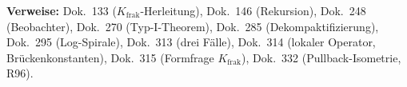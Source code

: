 \medskip\noindent
\textbf{Verweise:} Dok.~133 ($K_{\text{frak}}$-Herleitung),
Dok.~146 (Rekursion), Dok.~248 (Beobachter),
Dok.~270 (Typ-I-Theorem), Dok.~285 (Dekompaktifizierung),
Dok.~295 (Log-Spirale), Dok.~313 (drei Fälle),
Dok.~314 (lokaler Operator, Brückenkonstanten),
Dok.~315 (Formfrage $K_{\text{frak}}$),
Dok.~332 (Pullback-Isometrie, R96).
